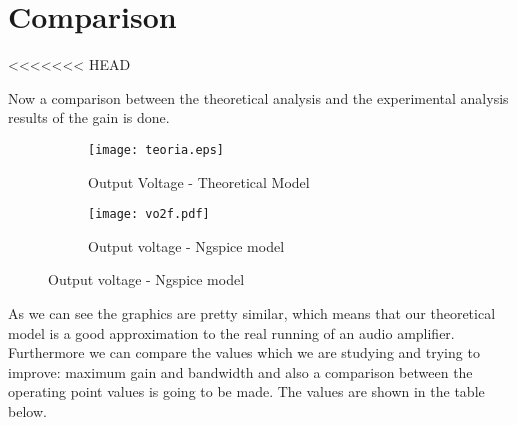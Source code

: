 \section{Comparison}
\label{section:comparison}

<<<<<<< HEAD
\par Now a comparison between the theoretical analysis and the experimental analysis results of the gain is done.
 

\begin{figure}[H]
\centering
\begin{subfigure}{.5\textwidth}
  \centering
  \texttt{[image: teoria.eps]}
  \caption{Output Voltage - Theoretical Model}
  \label{fig:sim4}
\end{subfigure}
\begin{subfigure}{.5\textwidth}
  \centering
  \texttt{[image: vo2f.pdf]}
  \caption{Output voltage - Ngspice model}
  \label{fig:sim5}
\end{subfigure}
\end{figure}

\par As we can see the graphics are pretty similar, which means that our theoretical model is a good approximation to the real running of an audio amplifier. Furthermore we can compare the values which we are studying and trying to improve: maximum gain and bandwidth and also a comparison between the operating point values is going to be made. The values are shown in the table below.

